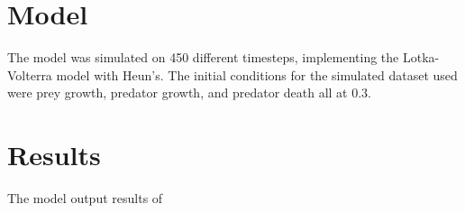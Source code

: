 \section{Model}

The model was simulated on 450 different timesteps, implementing the Lotka-Volterra model with Heun's. The initial conditions for the simulated dataset used were prey growth, predator growth, and predator death all at 0.3.



\section{Results}

The model output results of 

